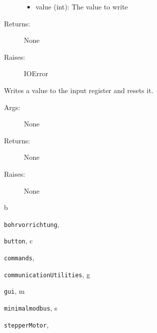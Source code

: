 \documentclass[letterpaper,10pt,english]{sphinxmanual}
\begin{document}
\begin{fulllineitems}
\begin{fulllineitems}
\begin{description}
\begin{itemize}
\item {} 
value (int): The value to write

\end{itemize}

\item[{Returns:}] \leavevmode
None

\item[{Raises:}] \leavevmode
IOError

\end{description}

\end{fulllineitems}


\begin{fulllineitems}
\label{stepperMotor:stepperMotor.StepperMotor.writeToInputRegister}
Writes a value to the input register and resets it.
\begin{description}
\item[{Args:}] \leavevmode
None

\item[{Returns:}] \leavevmode
None

\item[{Raises:}] \leavevmode
None

\end{description}

\end{fulllineitems}


\end{fulllineitems}



\renewcommand{\indexname}{Python Module Index}
\begin{theindex}
\def\bigletter#1{{\Large\sffamily#1}\nopagebreak\vspace{1mm}}
\bigletter{b}
\item {\texttt{bohrvorrichtung}}, \pageref{bohrvorrichtung:module-bohrvorrichtung}
\item {\texttt{button}}, \pageref{button:module-button}
\indexspace
\bigletter{c}
\item {\texttt{commands}}, \pageref{commands:module-commands}
\item {\texttt{communicationUtilities}}, \pageref{communicationUtilities:module-communicationUtilities}
\indexspace
\bigletter{g}
\item {\texttt{gui}}, \pageref{gui:module-gui}
\indexspace
\bigletter{m}
\item {\texttt{minimalmodbus}}, \pageref{minimalmodbus:module-minimalmodbus}
\indexspace
\bigletter{s}
\item {\texttt{stepperMotor}}, \pageref{stepperMotor:module-stepperMotor}
\end{theindex}

\renewcommand{\indexname}{Index}
\printindex
\end{document}
